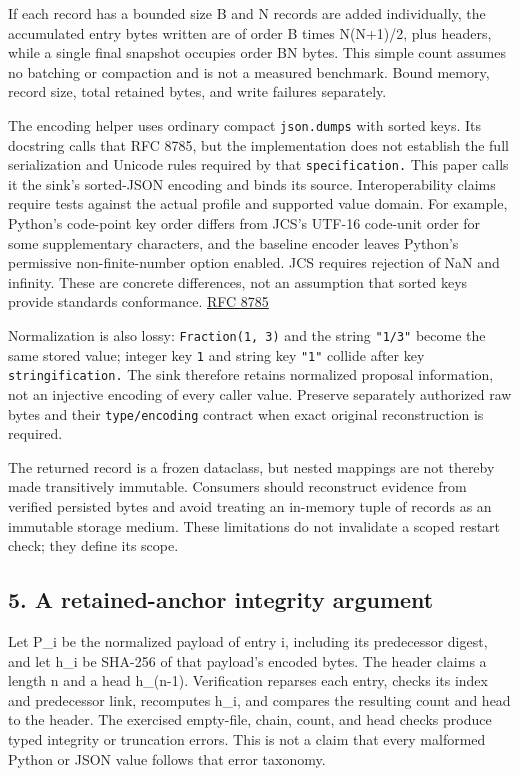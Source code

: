 \documentclass[
  11pt,
]{article}
\newcommand{\passthrough}[1]{#1}
\begin{document}
If each record has a bounded size B and N records are added
individually, the accumulated entry bytes written are of order B times
N(N+1)/2, plus headers, while a single final snapshot occupies order BN
bytes. This simple count assumes no batching or compaction and is not a
measured benchmark. Bound memory, record size, total retained bytes, and
write failures separately.

The encoding helper uses ordinary compact
\passthrough{\lstinline!json.dumps!} with sorted keys. Its docstring
calls that RFC 8785, but the implementation does not establish the full
serialization and Unicode rules required by that
\nolinkurl{specification.} This paper calls it the sink's sorted-JSON
encoding and binds its source. Interoperability claims require tests
against the actual profile and supported value domain. For example,
Python's code-point key order differs from JCS's UTF-16 code-unit order
for some supplementary characters, and the baseline encoder leaves
Python's permissive non-finite-number option enabled. JCS requires
rejection of NaN and infinity. These are concrete differences, not an
assumption that sorted keys provide standards conformance.
\href{https://www.rfc-editor.org/rfc/rfc8785.html}{RFC 8785}

Normalization is also lossy: \passthrough{\lstinline!Fraction(1, 3)!}
and the string \passthrough{\lstinline!"1/3"!} become the same stored
value; integer key \passthrough{\lstinline!1!} and string key
\passthrough{\lstinline!"1"!} collide after key
\nolinkurl{stringification.} The sink therefore retains normalized
proposal information, not an injective encoding of every caller value.
Preserve separately authorized raw bytes and their
\nolinkurl{type/encoding} contract when exact original reconstruction is
required.

The returned record is a frozen dataclass, but nested mappings are not
thereby made transitively immutable. Consumers should reconstruct
evidence from verified persisted bytes and avoid treating an in-memory
tuple of records as an immutable storage medium. These limitations do
not invalidate a scoped restart check; they define its scope.

\subsection{5. A retained-anchor integrity
argument}\label{a-retained-anchor-integrity-argument}

Let P\_i be the normalized payload of entry i, including its predecessor
digest, and let h\_i be SHA-256 of that payload's encoded bytes. The
header claims a length n and a head h\_(n-1). Verification reparses each
entry, checks its index and predecessor link, recomputes h\_i, and
compares the resulting count and head to the header. The exercised
empty-file, chain, count, and head checks produce typed integrity or
truncation errors. This is not a claim that every malformed Python or
JSON value follows that error taxonomy.
\end{document}
